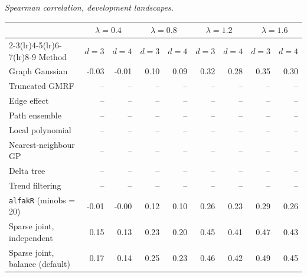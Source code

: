 \par\medskip\noindent\begin{minipage}{\linewidth}
\textit{Spearman correlation, development landscapes.}
\begin{center}
\footnotesize
\setlength{\tabcolsep}{3.5pt}
\begin{tabular}{l*{8}{r}}
\toprule
 & \multicolumn{2}{c}{$\lambda=0.4$} & \multicolumn{2}{c}{$\lambda=0.8$} & \multicolumn{2}{c}{$\lambda=1.2$} & \multicolumn{2}{c}{$\lambda=1.6$} \\
\cmidrule(lr){2-3}\cmidrule(lr){4-5}\cmidrule(lr){6-7}\cmidrule(lr){8-9}
Method & $d=3$ & $d=4$ & $d=3$ & $d=4$ & $d=3$ & $d=4$ & $d=3$ & $d=4$ \\
\midrule
Graph Gaussian & -0.03 & -0.01 & 0.10 & 0.09 & 0.32 & 0.28 & 0.35 & 0.30 \\
Truncated GMRF & -- & -- & -- & -- & -- & -- & -- & -- \\
Edge effect & -- & -- & -- & -- & -- & -- & -- & -- \\
Path ensemble & -- & -- & -- & -- & -- & -- & -- & -- \\
Local polynomial & -- & -- & -- & -- & -- & -- & -- & -- \\
Nearest-neighbour GP & -- & -- & -- & -- & -- & -- & -- & -- \\
Delta tree & -- & -- & -- & -- & -- & -- & -- & -- \\
Trend filtering & -- & -- & -- & -- & -- & -- & -- & -- \\
\texttt{alfakR} (minobs = 20) & -0.01 & -0.00 & 0.12 & 0.10 & 0.26 & 0.23 & 0.29 & 0.26 \\
Sparse joint, independent & 0.15 & 0.13 & 0.23 & 0.20 & 0.45 & 0.41 & 0.47 & 0.43 \\
Sparse joint, balance (default) & 0.17 & 0.14 & 0.25 & 0.23 & 0.46 & 0.42 & 0.49 & 0.45 \\
\bottomrule
\end{tabular}
\end{center}
\end{minipage}

